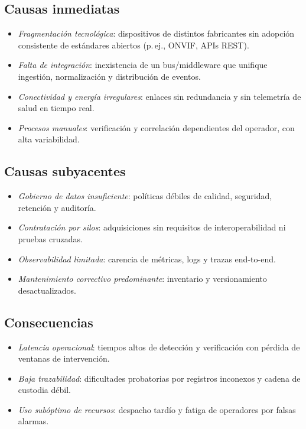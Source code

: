 \documentclass[12pt,a4paper]{article}
\begin{document}
\subsection*{Causas inmediatas}
\begin{itemize}
    \item \textit{Fragmentación tecnológica}: dispositivos de distintos fabricantes sin adopción consistente de estándares abiertos (p.\,ej., ONVIF, APIs REST).
    \item \textit{Falta de integración}: inexistencia de un bus/middleware que unifique ingestión, normalización y distribución de eventos.
    \item \textit{Conectividad y energía irregulares}: enlaces sin redundancia y sin telemetría de salud en tiempo real.
    \item \textit{Procesos manuales}: verificación y correlación dependientes del operador, con alta variabilidad.
\end{itemize}

\subsection*{Causas subyacentes}
\begin{itemize}
    \item \textit{Gobierno de datos insuficiente}: políticas débiles de calidad, seguridad, retención y auditoría.
    \item \textit{Contratación por silos}: adquisiciones sin requisitos de interoperabilidad ni pruebas cruzadas.
    \item \textit{Observabilidad limitada}: carencia de métricas, logs y trazas end-to-end.
    \item \textit{Mantenimiento correctivo predominante}: inventario y versionamiento desactualizados.
\end{itemize}

\subsection*{Consecuencias}
\begin{itemize}
    \item \textit{Latencia operacional}: tiempos altos de detección y verificación con pérdida de ventanas de intervención.
    \item \textit{Baja trazabilidad}: dificultades probatorias por registros inconexos y cadena de custodia débil.
    \item \textit{Uso subóptimo de recursos}: despacho tardío y fatiga de operadores por falsas alarmas.
\end{itemize}
\end{document}
